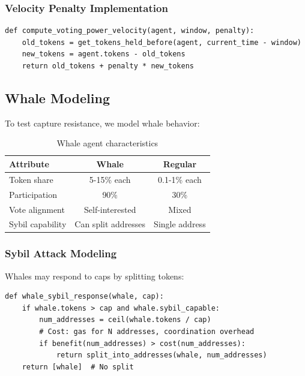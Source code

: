 \subsubsection{Velocity Penalty Implementation}

\begin{lstlisting}[caption=Velocity penalty mechanism (pseudocode)]
def compute_voting_power_velocity(agent, window, penalty):
    old_tokens = get_tokens_held_before(agent, current_time - window)
    new_tokens = agent.tokens - old_tokens
    return old_tokens + penalty * new_tokens
\end{lstlisting}

\subsection{Whale Modeling}

To test capture resistance, we model whale behavior:

\begin{table}[htbp]
\centering
\caption{Whale agent characteristics}
\label{tab:whale-model}
\begin{tabular}{lcc}
\toprule
Attribute & Whale & Regular \\
\midrule
Token share & 5-15\% each & 0.1-1\% each \\
Participation & 90\% & 30\% \\
Vote alignment & Self-interested & Mixed \\
Sybil capability & Can split addresses & Single address \\
\bottomrule
\end{tabular}
\end{table}

\subsubsection{Sybil Attack Modeling}

Whales may respond to caps by splitting tokens:

\begin{lstlisting}[caption=Sybil attack modeling (pseudocode)]
def whale_sybil_response(whale, cap):
    if whale.tokens > cap and whale.sybil_capable:
        num_addresses = ceil(whale.tokens / cap)
        # Cost: gas for N addresses, coordination overhead
        if benefit(num_addresses) > cost(num_addresses):
            return split_into_addresses(whale, num_addresses)
    return [whale]  # No split
\end{lstlisting}

